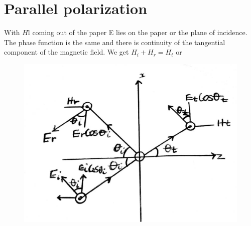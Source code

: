 \section{Parallel polarization}
With $H$l coming out of the paper E lies on the paper or the plane of incidence. The phase function is the same and there is continuity of the tangential component of the magnetic field.
We get $H_{i} + H_{r} = H_{t}$ or
\begin{figure}[h]
\centering
\includegraphics[width=1\linewidth]{./graphics/15}
\caption{}
\label{fig:15}
\end{figure}

